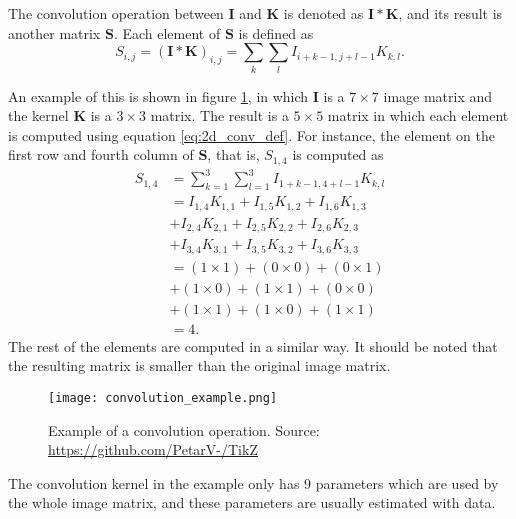 The convolution operation between $\boldsymbol{I}$ and $\boldsymbol{K}$ is denoted as $\boldsymbol{I} * \boldsymbol{K}$, and its result is another matrix $\boldsymbol{S}$. Each element of $\boldsymbol{S}$ is defined as
\begin{equation}
  \label{eq:2d_conv_def}
  S_{i,j} = (\boldsymbol{I} * \boldsymbol{K})_{i,j} = \sum_{k} \sum_{l} I_{i+k-1,j+l-1} K_{k, l}.
\end{equation}

An example of this is shown in figure \ref{fig:conv_example}, in which $\boldsymbol{I}$ is a $7 \times 7$ image matrix and the kernel $\boldsymbol{K}$ is a $3 \times 3$ matrix. The result is a $5 \times 5$ matrix in which each element is computed using equation \eqref{eq:2d_conv_def}. For instance, the element on the first row and fourth column of $\boldsymbol{S}$, that is, $S_{1,4}$ is computed as
\begin{equation}
  \begin{split}
      S_{1,4} & =
      \sum_{k=1}^3 \sum_{l=1}^3 I_{1+k-1,4+l-1} K_{k, l} \\
      & = I_{1,4}K_{1,1} + I_{1,5}K_{1,2} + I_{1,6}K_{1,3} \\
      & + I_{2,4}K_{2,1} + I_{2,5}K_{2,2} + I_{2,6}K_{2,3} \\
      & + I_{3,4}K_{3,1} + I_{3,5}K_{3,2} + I_{3,6}K_{3,3} \\
      & = ( 1 \times 1 ) + ( 0 \times 0 ) + ( 0 \times 1 ) \\
      & + ( 1 \times 0 ) + ( 1 \times 1 ) + ( 0 \times 0 ) \\
      & + ( 1 \times 1 ) + ( 1 \times 0 ) + ( 1 \times 1 ) \\
      & = 4.
  \end{split}
\end{equation}
The rest of the elements are computed in a similar way. It should be noted that the resulting matrix is smaller than the original image matrix.

\begin{figure}[H]
    \centering
    \texttt{[image: convolution\_example.png]}
    \caption{Example of a convolution operation. Source: \url{https://github.com/PetarV-/TikZ}}
    \label{fig:conv_example}
\end{figure}

The convolution kernel in the example only has 9 parameters which are used by the whole image matrix, and these parameters are usually estimated with data.

